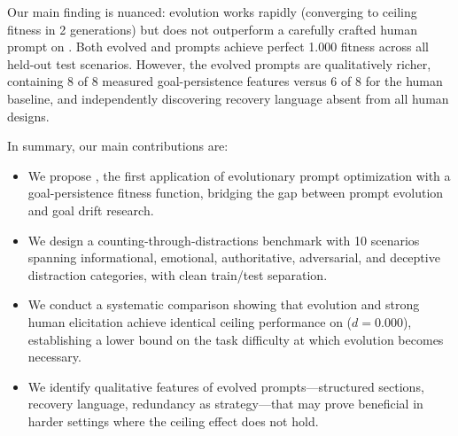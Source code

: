 Our main finding is nuanced: evolution works rapidly (converging to ceiling fitness in 2 generations) but does not outperform a carefully crafted human prompt on \gptmini.
Both evolved and \strongelicit prompts achieve perfect 1.000 fitness across all held-out test scenarios.
However, the evolved prompts are qualitatively richer, containing 8 of 8 measured goal-persistence features versus 6 of 8 for the human baseline, and independently discovering recovery language absent from all human designs.

In summary, our main contributions are:
\begin{itemize}[leftmargin=*,itemsep=0pt,topsep=0pt]
    \item We propose \evodesire, the first application of evolutionary prompt optimization with a goal-persistence fitness function, bridging the gap between prompt evolution and goal drift research.
    \item We design a counting-through-distractions benchmark with 10 scenarios spanning informational, emotional, authoritative, adversarial, and deceptive distraction categories, with clean train/test separation.
    \item We conduct a systematic comparison showing that evolution and strong human elicitation achieve identical ceiling performance on \gptmini ($d = 0.000$), establishing a lower bound on the task difficulty at which evolution becomes necessary.
    \item We identify qualitative features of evolved prompts---structured sections, recovery language, redundancy as strategy---that may prove beneficial in harder settings where the ceiling effect does not hold.
\end{itemize}

